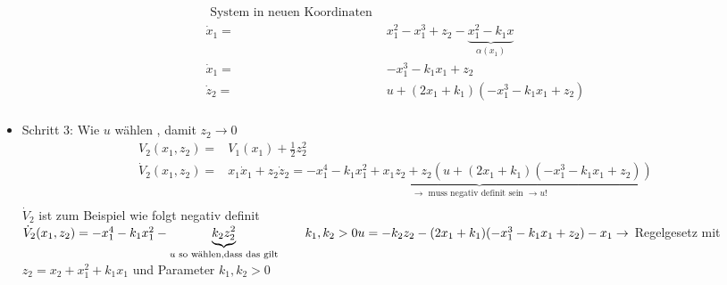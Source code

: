 \documentclass[11pt,a4paper]{article}
\begin{document}
\begin{itemize}
\begin{align*}
\text{ System in neuen Koordinaten }\\
\dot x_1 = & x_1^2 - x_1^3 + z_2 - \underbrace{x_1^2 - k_1 x}_{\alpha(x_1)}\\
\dot x_1 = & -x_1^3 - k_1x_1 + z_2 \tag{5.5a}\\
\dot z_2 = & u + (2 x_1 + k_1) (-x_1^3 - k_1 x_1 + z_2) \tag{5.5b}\\
\end{align*}
\item Schritt 3: Wie $u$ wählen , damit $z_2 \to 0$
\begin{align*}
V_2(x_1,z_2) = &V_1(x_1) + \frac{1}{2} z_2^2\\
\dot V_2(x_1,z_2) = & x_1 \dot x_1 + z_2 \dot z_2 = \underbrace{- x_1^4 - k_1x_1^2 + x_1 z_2 + z_2 (u +(2x_1 + k_1)(-x_1^3 - k_1 x_1 + z_2))}_{\rightarrow \text{ muss negativ definit sein }\to u!}\\
\end{align*}
$\dot V_2 $ ist zum Beispiel wie folgt negativ definit \\
$\dot V_2(x_1,z_2) = - x_1^4 - k_1 x_1^2 - \underbrace{k_2 z_2^2}_{u \text{ so wählen,dass das gilt}} \qquad k_1,k_2 > 0 \\
u = -k_2z_2 - (2x_1 + k_1)(-x_1^3 - k_1 x_1 + z_2) - x_1\\
\rightarrow$ Regelgesetz mit $z_2 = x_2 + x_1^2 + k_1 x_1$ und Parameter $k_1, k_2 > 0$
\end{itemize}
\end{document}
